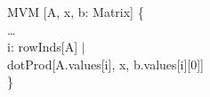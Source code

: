 \begin{myquote}
\Bpred MVM [A, x, b: Matrix] \{\\
\TA \ldots\\
\TA \Ball i: rowInds[A] $|$\\
\TB dotProd[A.values[i], x, b.values[i][0]]\\
\}
\end{myquote}